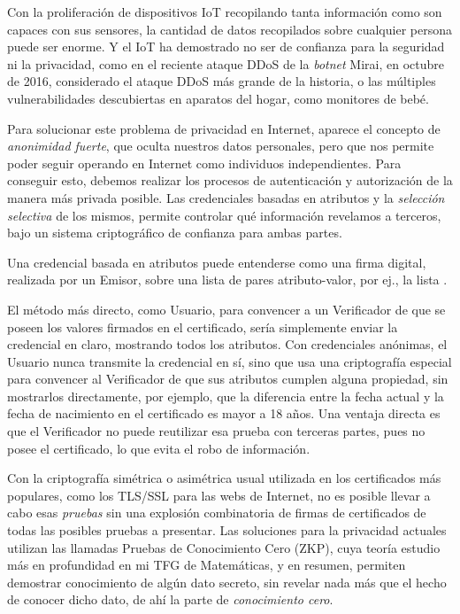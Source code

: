 Con la proliferación de dispositivos IoT recopilando tanta información como son capaces con sus sensores, la cantidad de datos recopilados sobre cualquier persona puede ser enorme. Y el IoT ha demostrado no ser de confianza para la seguridad ni la privacidad, como en el reciente ataque DDoS de la \textit{botnet} Mirai, en octubre de 2016, considerado el ataque DDoS más grande de la historia\citep{jeyanthi:2017}, o las múltiples vulnerabilidades descubiertas en aparatos del hogar, como monitores de bebé\citep{rapid7babycam}.

Para solucionar este problema de privacidad en Internet, aparece el concepto de \textit{anonimidad fuerte}, que oculta nuestros datos personales, pero que nos permite poder seguir operando en Internet como individuos independientes\citep{stronganonymity}. Para conseguir esto, debemos realizar los procesos de autenticación y autorización de la manera más privada posible. Las credenciales basadas en atributos y la \textit{selección selectiva} de los mismos, permite controlar qué información revelamos a terceros, bajo un sistema criptográfico de confianza para ambas partes.

Una credencial basada en atributos puede entenderse como una firma digital, realizada por un Emisor, sobre una lista de pares atributo-valor, por ej., la lista \texttt{}\citep{introCredIBM}.


El método más directo, como Usuario, para convencer a un Verificador de que se poseen los valores firmados en el certificado, sería simplemente enviar la credencial en claro, mostrando todos los atributos. Con credenciales anónimas, el Usuario nunca transmite la credencial en sí, sino que usa una criptografía especial para convencer al Verificador de que sus atributos cumplen alguna propiedad, sin mostrarlos directamente, por ejemplo, que la diferencia entre la fecha actual y la fecha de nacimiento en el certificado es mayor a 18 años. Una ventaja directa es que el Verificador no puede reutilizar esa prueba con terceras partes, pues no posee el certificado, lo que evita el robo de información.


Con la criptografía simétrica o asimétrica usual utilizada en los certificados más populares, como los TLS/SSL para las webs de Internet, no es posible llevar a cabo esas \textit{pruebas} sin una explosión combinatoria de firmas de certificados de todas las posibles pruebas a presentar. Las soluciones para la privacidad actuales utilizan las llamadas Pruebas de Conocimiento Cero (ZKP), cuya teoría estudio más en profundidad en mi TFG de Matemáticas\citep{tfgmates}, y en resumen, permiten demostrar conocimiento de algún dato secreto, sin revelar nada más que el hecho de conocer dicho dato, de ahí la parte de \textit{conocimiento cero}.

